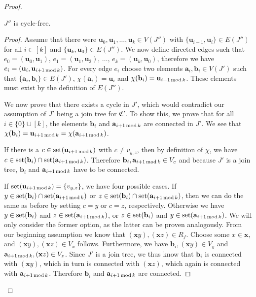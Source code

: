 \begin{proof}
	\begin{claim}
		$J''$ is cycle-free.
	\end{claim}
	\begin{proof}
		Assume that there were $\mathbf u_0,\mathbf u_1,\dots,\mathbf u_k\in V(J'')$ with $\{\mathbf u_{i-1},\mathbf u_i\}\in E(J'')$ for all $i\in [k]$ and $\{\mathbf u_k,\mathbf u_0\}\in E(J'')$.
		We now define directed edges such that $e_0=(\mathbf u_0,\mathbf u_1)$, $e_1=(\mathbf u_1,\mathbf u_2)$, $\dots$, $e_k=(\mathbf u_k,\mathbf u_0)$, therefore we have $e_i=(\mathbf u_i, \mathbf u_{i+1\operatorname{mod} k})$.
		For every edge $e_i$ choose two elements $\mathbf a_i,\mathbf b_i\in V(J')$ such that $\{\mathbf a_i,\mathbf b_i\}\in E(J')$, $\chi(\mathbf a_i)=\mathbf u_i$ and $\chi(\mathbf b_i)=\mathbf u_{i+1\operatorname{mod} k}$.
		These elements must exist by the definition of $E(J'')$.
		
		We now prove that there exists a cycle in $J'$, which would contradict our assumption of $J'$ being a join tree for $\mathfrak C'$.
		To show this, we prove that for all $i\in\{0\}\cup[k]$, the elements $\mathbf b_i$ and $\mathbf a_{i+1\operatorname{mod} k}$ are connected in $J'$.
		We see that $\chi(\mathbf b_i)=\mathbf u_{i+1\operatorname{mod} k} = \chi(\mathbf a_{i+1\operatorname{mod} k})$.
		
		If there is a $c\in \operatorname{set}(\mathbf u_{i+1\operatorname{mod} k})$ with $c\neq v_{y,z}$, then by definition of $\chi$, we have $c\in \operatorname{set}(\mathbf b_i)\cap \operatorname{set}(\mathbf a_{i+1\operatorname{mod} k})$.
		Therefore $\mathbf b_i,\mathbf a_{i+1\operatorname{mod} k}\in V_c$ and because $J'$ is a join tree, $\mathbf b_i$ and $\mathbf a_{i+1\operatorname{mod} k}$ have to be connected.
		
		If $\operatorname{set}(\mathbf u_{i+1\operatorname{mod} k})=\{v_{y,z}\}$, we have four possible cases.
		If $y\in \operatorname{set}(\mathbf b_i)\cap \operatorname{set}(\mathbf a_{i+1\operatorname{mod} k})$ or $z\in \operatorname{set}(\mathbf b_i)\cap \operatorname{set}(\mathbf a_{i+1\operatorname{mod} k})$, then we can do the same as before by setting $c=y$ or $c=z$, respectively.
		Otherwise we have $y\in\operatorname{set}(\mathbf b_i)$ and $z\in \operatorname{set}(\mathbf a_{i+1\operatorname{mod} k})$, or $z\in\operatorname{set}(\mathbf b_i)$ and $y\in \operatorname{set}(\mathbf a_{i+1\operatorname{mod} k})$.
		We will only consider the former option, as the latter can be proven analogously.
		From our beginning assumption we know that $(\mathbf xy),(\mathbf xz)\in R_f$. Choose some $x\in\mathbf x$, and $(\mathbf xy),(\mathbf xz)\in V_x$ follows.
		Furthermore, we have $\mathbf b_i,(\mathbf xy)\in V_y$ and $\mathbf a_{i+1\operatorname{mod} k},(\mathbf xz)\in V_z$.
		Since $J'$ is a join tree, we thus know that $\mathbf b_i$ is connected with $(\mathbf xy)$, which in turn is connected with $(\mathbf xz)$, which again is connected with $\mathbf a_{i+1\operatorname{mod} k}$.
		Therefore $\mathbf b_i$ and $\mathbf a_{i+1\operatorname{mod} k}$ are connected.
		

\end{proof}
\end{proof}
